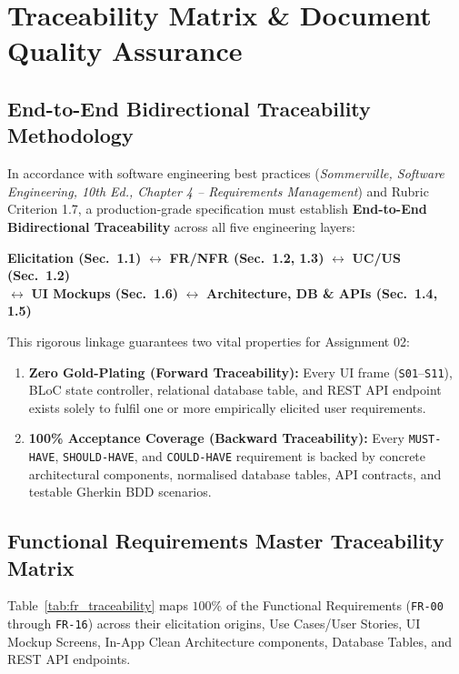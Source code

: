 \section{Traceability Matrix \& Document Quality Assurance}
\label{sec:traceability}

\subsection{End-to-End Bidirectional Traceability Methodology}
\label{subsec:traceability_method}

In accordance with software engineering best practices (\textit{Sommerville, Software Engineering, 10th Ed., Chapter 4 -- Requirements Management}) and Rubric Criterion 1.7, a production-grade specification must establish \textbf{End-to-End Bidirectional Traceability} across all five engineering layers:
\begin{center}
\footnotesize
\textbf{Elicitation (Sec.\ 1.1)} $\longleftrightarrow$ \textbf{FR/NFR (Sec.\ 1.2, 1.3)} $\longleftrightarrow$ \textbf{UC/US (Sec.\ 1.2)}\\
$\longleftrightarrow$ \textbf{UI Mockups (Sec.\ 1.6)} $\longleftrightarrow$ \textbf{Architecture, DB \& APIs (Sec.\ 1.4, 1.5)}
\end{center}
This rigorous linkage guarantees two vital properties for Assignment 02:
\begin{enumerate}
    \item \textbf{Zero Gold-Plating (Forward Traceability):} Every UI frame (\texttt{S01}--\texttt{S11}), BLoC state controller, relational database table, and REST API endpoint exists solely to fulfil one or more empirically elicited user requirements.
    \item \textbf{100\% Acceptance Coverage (Backward Traceability):} Every \texttt{MUST-HAVE}, \texttt{SHOULD-HAVE}, and \texttt{COULD-HAVE} requirement is backed by concrete architectural components, normalised database tables, API contracts, and testable Gherkin BDD scenarios.
\end{enumerate}

\subsection{Functional Requirements Master Traceability Matrix}
\label{subsec:fr_traceability}

Table~\ref{tab:fr_traceability} maps $100\%$ of the Functional Requirements (\texttt{FR-00} through \texttt{FR-16}) across their elicitation origins, Use Cases/User Stories, UI Mockup Screens, In-App Clean Architecture components, Database Tables, and REST API endpoints.

